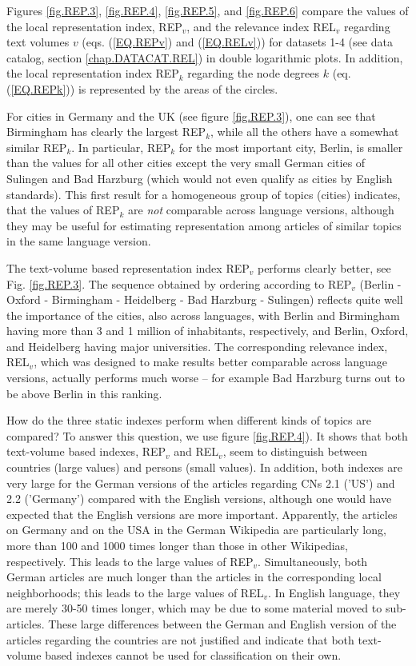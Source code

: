 \documentclass[a4paper,10pt]{scrbook}
\begin{document}
Figures \ref{fig.REP.3}, \ref{fig.REP.4}, \ref{fig.REP.5}, and \ref{fig.REP.6} compare the values of the local representation index, REP$_v$, 
and the relevance index REL$_v$ regarding text volumes $v$ (eqs. (\ref{EQ.REPv}) and
(\ref{EQ.RELv})) for datasets 1-4 (see data catalog, section \ref{chap.DATACAT.REL}) in double logarithmic plots. In addition, the local representation index REP$_k$ regarding the node degrees $k$ (eq. (\ref{EQ.REPk})) is 
represented by the areas of the circles.

For cities in Germany and the UK (see figure \ref{fig.REP.3}), one can see that 
Birmingham has clearly the largest REP$_k$, while all the others have a somewhat
similar REP$_k$. In particular, REP$_k$ for the most important city, Berlin, 
is smaller than the values for all other cities except the very small German
cities of Sulingen and Bad Harzburg (which would not even qualify as cities 
by English standards). This first result for a homogeneous group of topics
(cities) indicates, that the values of REP$_k$ are {\it not} comparable across 
language versions, although they may be useful for estimating representation 
among articles of similar topics in the same language version.

The text-volume based representation index REP$_v$ performs clearly better,
see Fig. \ref{fig.REP.3}. The sequence obtained by ordering according to REP$_v$ (Berlin 
- Oxford - Birmingham - Heidelberg - Bad Harzburg - Sulingen) reflects quite 
well the importance of the cities, also across languages, with Berlin and
Birmingham having more than 3 and 1 million of inhabitants, respectively, 
and Berlin, Oxford, and Heidelberg having major universities. The
corresponding relevance index, REL$_v$, which was designed to make results 
better comparable across language versions, actually performs much worse -- 
for example Bad Harzburg turns out to be above Berlin in this ranking.

How do the three static indexes perform when different kinds of topics are 
compared?  To answer this question, we use figure \ref{fig.REP.4}). It 
shows that both text-volume based indexes, REP$_v$ and REL$_v$, seem to 
distinguish between countries (large values) and persons (small values). 
In addition, both indexes are very large for the German versions of the 
articles regarding CNs 2.1 ('US') and 2.2 ('Germany') compared with the 
English versions, although one would have expected that the English versions 
are more important. Apparently, the articles on Germany and on the USA in 
the German Wikipedia are particularly long, more than 100 and 1000 times 
longer than those in other Wikipedias, respectively. This leads to the 
large values of REP$_v$. Simultaneously, both German articles are much 
longer than the articles in the corresponding local neighborhoods; this 
leads to the large values of REL$_v$. In English language, they are merely 
30-50 times longer, which may be due to some material moved to sub-articles.
These large differences between the German and English version of the articles
regarding the countries are not justified and indicate that both text-volume 
based indexes cannot be used for classification on their own.
\end{document}
